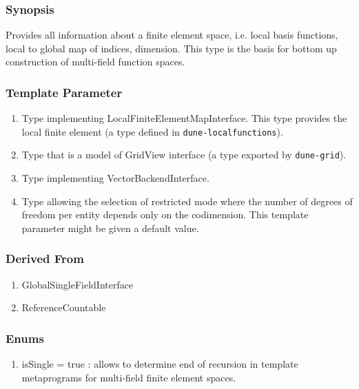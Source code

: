 \documentclass[11pt,a4paper,DIV11,%
notitlepage,oneside,abstracton,%
bibtotoc]{scrartcl}
\begin{document}
\subsubsection{Synopsis}

Provides all information about a finite element space, i.e. local
basis functions, local to global map of indices, dimension.
This type is the basis for bottom up construction of multi-field
function spaces.


\subsubsection{Template Parameter}

\begin{enumerate}[1)]
\item Type implementing LocalFiniteElementMapInterface. This
  type provides the local finite element (a type defined in
  \lstinline|dune-localfunctions|). 
\item Type that is a model of GridView interface (a type exported
  by \lstinline|dune-grid|). 
\item Type implementing VectorBackendInterface.
\item Type allowing the selection of restricted mode where the number
  of degrees of freedom per entity depends only on the
  codimension. This template parameter might be given a default value.
\end{enumerate}

\subsubsection{Derived From}

\begin{enumerate}[1)]
\item GlobalSingleFieldInterface
\item ReferenceCountable
\end{enumerate}


\subsubsection{Enums}

\begin{enumerate}[1)]
\item isSingle = true : allows to determine end of recursion in
  template metaprograms for multi-field finite element spaces.
\end{enumerate}
\end{document}
